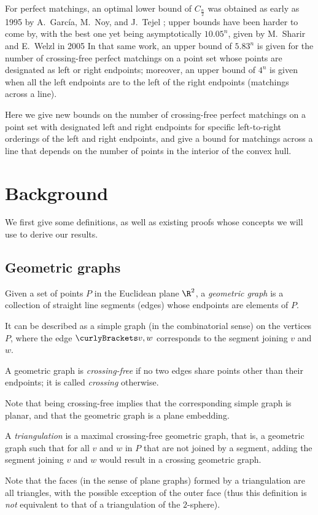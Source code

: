 \documentclass[10pt, a4paper, twoside]{basestyle}
\begin{document}
For perfect matchings, an optimal lower bound of $C_{\frac n 2}$ was obtained as early as 1995 by A.~García,
M.~Noy, and J.~Tejel \cite{GarciaNoyTejel2000}; upper bounds have been harder to come by, with the best one
yet being asymptotically $10.05^n$, given by M.~Sharir and E.~Welzl in 2005 \cite{SharirWelzl2006}
In that same work, an upper bound of $5.83^n$ is given for the number of crossing-free perfect matchings on a
point set whose points are designated as left or right endpoints; moreover, an upper bound of $4^n$ is given
when all the left endpoints are to the left of the right endpoints (matchings across a line).

Here we give new bounds on the number of crossing-free perfect matchings on a point set with designated left and
right endpoints for specific left-to-right orderings of the left and right endpoints, and give a bound for
matchings across a line that depends on the number of points in the interior of the convex hull.
\section{Background}
We first give some definitions, as well as existing proofs whose concepts we will use to derive our results.
\subsection{Geometric graphs}
\begin{definition}
Given a set of points $P$ in the Euclidean plane $\R^2$,
a \emph{geometric graph} is a collection of straight line segments (edges)
whose endpoints are elements of $P$.

It can be described as a simple graph (in the combinatorial sense)
on the vertices $P$, where the edge $\set{v,w}$ corresponds to the segment joining
$v$ and $w$.
\end{definition}
\begin{definition}
A geometric graph is \emph{crossing-free} if no two edges share points other than
their endpoints; it is called \emph{crossing} otherwise.
\end{definition}
Note that being crossing-free implies that the corresponding simple graph is planar, and that the
geometric graph is a plane embedding.
\begin{definition}[triangulation]
A \emph{triangulation} is a maximal crossing-free geometric graph, that is, a
geometric graph such that for all $v$ and $w$ in $P$ that are not joined by a
segment, adding the segment joining $v$ and $w$ would result in a crossing
geometric graph.
\end{definition}
Note that the faces (in the sense of plane graphs) formed by a triangulation are
all triangles, with the possible exception of the outer face (thus this definition
is \emph{not} equivalent to that of a triangulation of the $2$-sphere).
\end{document}

